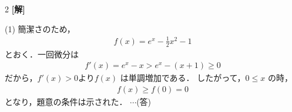 \documentclass[../../../../main.tex]{subfiles}
\begin{document}
\setcounter{equation}{0}
\begin{oframed}
  
\end{oframed}
\setlength{\columnseprule}{0.4pt}
\begin{multicols}{2}
  {\bf[解]}

  (1)
  簡潔さのため，
  \begin{align*}
    f(x) = e^x - \frac{1}{2}x^2-1
  \end{align*}
  とおく．一回微分は
  \begin{align*}
    f'(x) = e^x - x > e^x - (x+1) \geq 0
  \end{align*}
  だから，$f'(x)>0$より$f(x)$ は単調増加である．
  したがって，$0 \leq x$ の時，
  \begin{align*}
    f(x) \geq f(0) = 0
  \end{align*}
  となり，題意の条件は示された．  $\cdots$(答)


\end{multicols}
\end{document}
